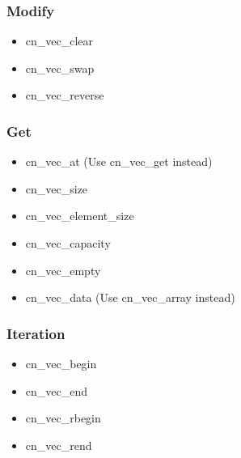 \documentclass[12pt]{article}
\begin{document}
\subsubsection{Modify}\begin{itemize}
	\item cn_vec_clear

	\item cn_vec_swap

	\item cn_vec_reverse

\end{itemize}
\subsubsection{Get}\begin{itemize}
	\item cn_vec_at (Use cn_vec_get instead)

	\item cn_vec_size

	\item cn_vec_element_size

	\item cn_vec_capacity

	\item cn_vec_empty

	\item cn_vec_data (Use cn_vec_array instead)

\end{itemize}
\subsubsection{Iteration}\begin{itemize}
	\item cn_vec_begin

	\item cn_vec_end

	\item cn_vec_rbegin

	\item cn_vec_rend

\end{itemize}
\end{document}
